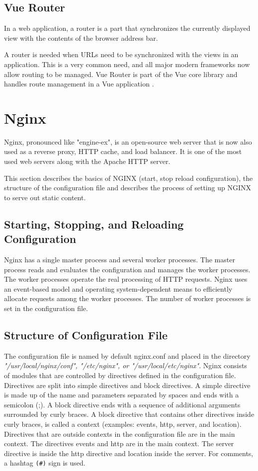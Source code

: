 \subsection{Vue Router }
\label{sec:Vue Router}

In a web application, a router is a part that synchronizes the currently displayed view with the contents of the browser address bar.

A router is needed when \gls{URL}s need to be synchronized with the views in an application. This is a very common need, and all major modern frameworks now allow routing to be managed.   Vue Router is part of the Vue core library and handles route management in a Vue application \cite{VueGuide:Online}.


\section{Nginx}
\label{Grundlagen:Nginx}
Nginx, pronounced like "engine-ex", is an open-source web server that is now also used as a reverse proxy, HTTP cache, and load balancer. It is one of the most used web servers along with the Apache HTTP server.\cite{nginxIntro}

This section describes the basics of NGINX (start, stop reload configuration), the structure of the configuration file and describes the process of setting up NGINX to serve out static content.

\subsection{Starting, Stopping, and Reloading Configuration}
Nginx has a single master process and several worker processes. The master process reads and evaluates the configuration and manages the worker processes. The worker processes operate the real processing of HTTP requests. Nginx uses an event-based model and operating system-dependent means to efficiently allocate requests among the worker processes. The number of worker processes is set in the configuration file.\cite{nginxIntro}


\subsection{Structure of Configuration File }
The configuration file is named by default nginx.conf and placed in the directory \textit{"/usr/local/nginx/conf", "/etc/nginx", or "/usr/local/etc/nginx"}. Nginx consists of modules that are controlled by directives defined in the configuration file. Directives are split into simple directives and block directives. A simple directive is made up of the name and parameters separated by spaces and ends with a semicolon (;). A block directive ends with a sequence of additional arguments surrounded by curly braces. A block directive that contains other directives inside curly braces, is called a context (examples: events, http, server, and location). Directives that are outside contexts in the configuration file are in the main context. The directives events and http are in the main context. The server directive is inside the http directive and location inside the server. For comments, a hashtag \lstinline{(#)} sign is used.\cite*{nginxIntro}

